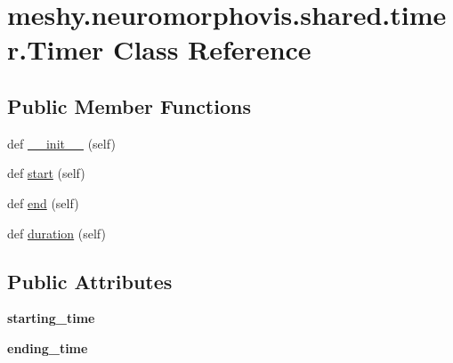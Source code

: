 \hypertarget{classmeshy_1_1neuromorphovis_1_1shared_1_1timer_1_1Timer}{}\section{meshy.\+neuromorphovis.\+shared.\+timer.\+Timer Class Reference}
\label{classmeshy_1_1neuromorphovis_1_1shared_1_1timer_1_1Timer}


 


\subsection*{Public Member Functions}
\begin{DoxyCompactItemize}
\item 
def \hyperlink{classmeshy_1_1neuromorphovis_1_1shared_1_1timer_1_1Timer_a70a5ac8b53b1216286b259dd57c194ee}{\+\_\+\+\_\+init\+\_\+\+\_\+} (self)
\item 
def \hyperlink{classmeshy_1_1neuromorphovis_1_1shared_1_1timer_1_1Timer_a6af275698fff9c3ddbba22d537c04d6e}{start} (self)
\item 
def \hyperlink{classmeshy_1_1neuromorphovis_1_1shared_1_1timer_1_1Timer_a4eb71370b5d1ee72e801bec52b931eb8}{end} (self)
\item 
def \hyperlink{classmeshy_1_1neuromorphovis_1_1shared_1_1timer_1_1Timer_aef942680f91beb641849fcf81a6d0151}{duration} (self)
\end{DoxyCompactItemize}
\subsection*{Public Attributes}
\begin{DoxyCompactItemize}
\item 
{\bfseries starting\+\_\+time}\hypertarget{classmeshy_1_1neuromorphovis_1_1shared_1_1timer_1_1Timer_abc081b1722c86ca40eed211a2d602ea8}{}\label{classmeshy_1_1neuromorphovis_1_1shared_1_1timer_1_1Timer_abc081b1722c86ca40eed211a2d602ea8}

\item 
{\bfseries ending\+\_\+time}\hypertarget{classmeshy_1_1neuromorphovis_1_1shared_1_1timer_1_1Timer_a92155618e1490faaee8c7cc1755c61e7}{}\label{classmeshy_1_1neuromorphovis_1_1shared_1_1timer_1_1Timer_a92155618e1490faaee8c7cc1755c61e7}

\end{DoxyCompactItemize}


